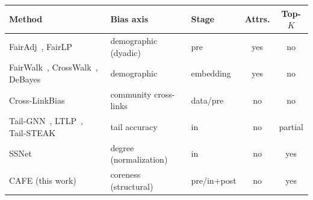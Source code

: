 \begin{tabular}{lllcc}
\toprule
Method & Bias axis & Stage & Attrs. & Top-$K$ \\
\midrule
FairAdj~\cite{fairadj}, FairLP~\cite{fairlp} & demographic (dyadic) & pre & yes & no \\
FairWalk~\cite{fairwalk}, CrossWalk~\cite{crosswalk}, DeBayes~\cite{debayes} & demographic & embedding & yes & no \\
Cross-LinkBias~\cite{crosslinkbias} & community cross-links & data/pre & no & no \\
Tail-GNN~\cite{tailgnn}, LTLP~\cite{ltlp}, Tail-STEAK~\cite{tailsteak} & tail accuracy & in & no & partial \\
SSNet~\cite{ssnet} & degree (normalization) & in & no & yes \\
CAFE (this work) & coreness (structural) & pre/in+post & no & yes \\
\bottomrule
\end{tabular}
